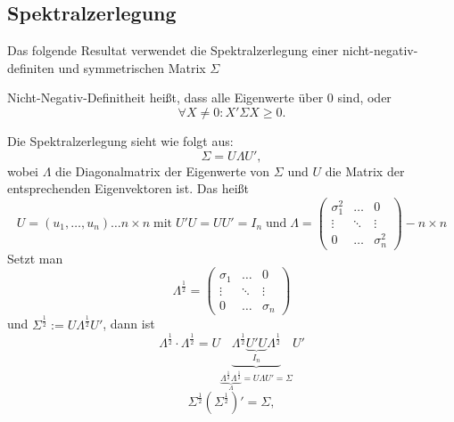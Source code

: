\documentclass[10pt]{article}
\newcommand{\halb}{\frac{1}{2}} %
\begin{document}
			\subsection{Spektralzerlegung}
			Das folgende Resultat verwendet die Spektralzerlegung einer nicht-negativ-definiten und symmetrischen Matrix $\Sigma$
			\begin{Bemerkung}
				Nicht-Negativ-Definitheit heißt, dass alle Eigenwerte über $0$ sind, oder \begin{equation*}
					\forall X \neq 0 : X' \Sigma X \geq 0.
				\end{equation*}
			\end{Bemerkung}
			
			Die Spektralzerlegung sieht wie folgt aus:
			\begin{equation*}
				\Sigma = U \Lambda U',
			\end{equation*}
			wobei $\Lambda$ die Diagonalmatrix der Eigenwerte von $\Sigma$ und $U$ die Matrix der entsprechenden Eigenvektoren ist. Das heißt \begin{equation*}
				U = (u_1, \ldots, u_n)\ldots n \times n \; \text{mit} \; U'U = UU' = I_n \; \text{und} \; \Lambda = \begin{pmatrix}
				\sigma_1^2 & \ldots & 0\\
				\vdots & \ddots & \vdots \\
				0 & \ldots & \sigma_n^2
				\end{pmatrix} - n\times n
			\end{equation*}
			Setzt man \begin{equation*}
				\Lambda^{\frac{1}{2}} = \begin{pmatrix}
					\sigma_1 & \ldots & 0\\
					\vdots & \ddots & \vdots \\
					0 & \ldots & \sigma_n
				\end{pmatrix}
			\end{equation*}
			und $\Sigma^{\frac{1}{2}} := U \Lambda^{\frac{1}{2}} U'$, dann ist \begin{equation*}
				\Lambda^{\halb} \cdot \Lambda^{\halb} = U \underbrace{\Lambda^{\frac{1}{2}} \underbrace{U'U}_{I_n} \Lambda^{\frac{1}{2}}}_{\underbrace{\Lambda^{\halb} \Lambda^{\halb}}_{\Lambda} = U \Lambda U' = \Sigma} U'
			\end{equation*}
			\begin{equation*}
				\Sigma^{\halb} \left(\Sigma^{\halb}\right)'=\Sigma, 
			\end{equation*}
\end{document}
